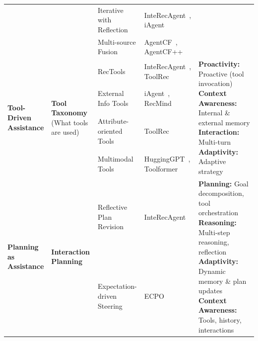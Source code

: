 \begin{table}[!t]
{\begin{tabular}{p{2.5cm} p{3cm} p{3.5cm} p{5cm} p{5cm}}
& & Iterative with Reflection
& InteRecAgent~\cite{huang2024interecagent}, iAgent~\cite{xu2025iagent}
& \\

& & Multi-source Fusion
& AgentCF~\cite{zhang2023agentcf}, AgentCF++~\cite{liu2025agentcf++}
& \\

\midrule

\multirow{4}{=}{\textbf{Tool-Driven Assistance}}

& \multirow{4}{=}{\textbf{Tool Taxonomy} \newline (What tools are used)}
& RecTools
& InteRecAgent~\cite{huang2024interecagent}, ToolRec~\cite{zhao2024toolrec}
& \multirow{4}{=}{\textbf{Proactivity:} Proactive (tool invocation) \newline
\textbf{Context Awareness:} Internal \& external memory \newline
\textbf{Interaction:} Multi-turn \newline
\textbf{Adaptivity:} Adaptive strategy} \\

& & External Info Tools
& iAgent~\cite{xu2025iagent}, RecMind~\cite{wang2024recmind}
& \\

& & Attribute-oriented Tools
& ToolRec~\cite{zhao2024toolrec}
& \\

& & Multimodal Tools
& HuggingGPT~\cite{shen2023hugginggpt}, Toolformer~\cite{schick2023toolformer}
& \\[14pt]

\midrule

\multirow{8}{=}{\textbf{Planning as Assistance}}

& \multirow{2}{=}{\textbf{Interaction} \newline \textbf{Planning}}
& Reflective Plan Revision
& InteRecAgent~\cite{huang2024interecagent}
& \multirow{8}{=}{\textbf{Planning:} Goal decomposition, tool orchestration \newline
\textbf{Reasoning:} Multi-step reasoning, reflection \newline
\textbf{Adaptivity:} Dynamic memory \& plan updates \newline
\textbf{Context Awareness:} Tools, history, interactions} \\

& & Expectation-driven Steering
& ECPO~\cite{feng2025expectation}
& \\[4pt]


\end{tabular}}
\end{table}
